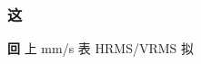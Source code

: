 \documentclass[11pt,a4paper]{article}
\numberwithin{equation}{section}
\numberwithin{figure}{section}
\begin{document}
\subsubsection{{\cjkfont 这}\allowbreak{}}

\textbf{{\cjkfont 回}\allowbreak{}} {\cjkfont 上}\allowbreak{} mm/\allowbreak{}s {\cjkfont 表}\allowbreak{} HRMS/\allowbreak{}VRMS {\cjkfont 拟}\allowbreak{}
\end{document}
